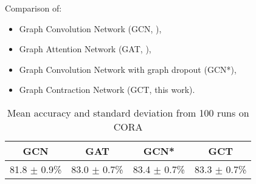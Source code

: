 
  Comparison of:
  \begin{itemize}
   \item Graph Convolution Network (GCN, \cite{kipf2016semi}),
   \item Graph Attention Network (GAT, \cite{velickovic2017graph}),
   \item Graph Convolution Network with graph dropout (GCN*),
   \item Graph Contraction Network (GCT, this work).
  \end{itemize}

  \begin{table}[H]
  \begin{center}
    \bgroup
    \def\arraystretch{1.5}%
    \begin{tabular}{|c|c|c|c|}
      \hline
      GCN & GAT & GCN* & GCT\\
      \hline
      81.8 $\pm$ 0.9\% & 83.0 $\pm$ 0.7\% & 83.4 $\pm$ 0.7\% & 83.3 $\pm$ 0.7\%\\
      \hline
    \end{tabular}
    \egroup
  \end{center}
  \caption{Mean accuracy and standard deviation from 100 runs on CORA}
  \end{table}

